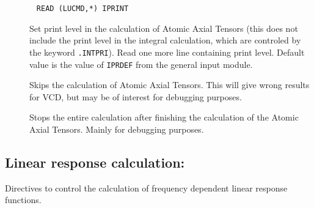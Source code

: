 \begin{description}
\item[]\verb| |\newline
\verb|READ (LUCMD,*) IPRINT|

Set print level in the calculation of Atomic Axial Tensors (this does
not include the print level in the integral calculation, which are
controled by the keyword \verb|.INTPRI|). Read one
more line containing print level. Default value is the value of
\verb|IPRDEF| from the general input module.

\item[] Skips the calculation of Atomic Axial Tensors.
This will give wrong results for VCD, but may be of interest for
debugging purposes.

\item[] Stops the entire calculation after finishing the 
calculation of the Atomic Axial Tensors. Mainly for debugging purposes.
\end{description}

\subsection{Linear response calculation: }\label{sec:abalnr}

Directives to control the calculation of frequency dependent linear
response
functions. 

